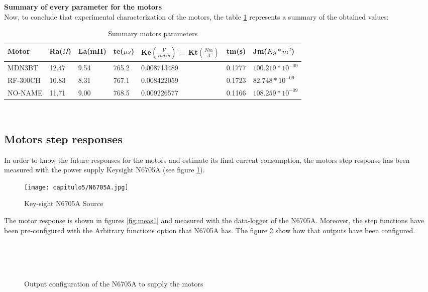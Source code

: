 \textbf{Summary of every parameter for the motors} \\ 
Now, to conclude that experimental characterization of the motors, the table \ref{tab:summary} represents a summary of the obtained values:
\begin{table}[H]
\centering
\begin{tabular}{ | l | l | l | l | l | l | l |}
\hline\hline
	Motor & Ra($\Omega$) & La(mH) & te($\mu s$)  & Ke$\left(\frac{V}{rad/s}\right)$ =  Kt$\left(\frac{Nm}{A}\right)$ & tm(s) & Jm($Kg*m^2$) \\ \hline
MDN3BT & 12.47& 9.54&765.2  & 0.008713489  & 0.1777 &  $100.219*10^{-09}$ \\ \hline
RF-300CH & 10.83 &8.31& 767.1  & 0.008422059  & 0.1723 &  $82.748 *10^{-09}$ \\ \hline
NO-NAME & 11.71 & 9.00& 768.5 & 0.009226577  & 0.1166 &  $108.259*10^{-09}$\\ \hline\hline 
\end{tabular}
\caption{Summary motors parameters} \label{tab:summary}
\end{table}\\

\subsection{Motors step responses}\label{ssec:steps}
In order to know the future responses for the motors and estimate its final current consumption, the motors step response has been measured with the power supply Keysight N6705A (see figure \ref{fig:N6705A}).

\begin{figure}[H]
\centering
		\texttt{[image: capitulo5/N6705A.jpg]}
	\caption{Key-sight N6705A Source \cite{N6705A}}
	\label{fig:N6705A}
\end{figure}

The motor response is shown in figures \ref{fig:meas1} and measured with the data-logger of the N6705A. Moreover, the step functions have been pre-configured with the Arbitrary functions option that N6705A has. The figure \ref{fig:fuentes} show how that outputs have been configured. 

\begin{figure}[H]
\centering
{}
 \\
 \\
 \\
\caption{Output configuration of the N6705A  to supply the motors} \label{fig:fuentes}
\end{figure}

